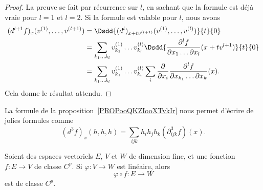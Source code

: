 \begin{proof}
    La preuve se fait par récurrence sur \( l\), en sachant que la formule est déjà vraie pour \( l=1\) et \( l=2\). Si la formule est valable pour \( l\), nous avons
    \begin{subequations}
        \begin{align}
            (d^{l+1}f)_x(v^{(1)},\ldots, v^{(l+1)})&=\Dsdd{ (d^l)_{x+tv^{(l+1)}}(v^{(1)},\ldots, v^{(l)}) }{t}{0}\\
            &=\sum_{k_1\ldots k_l}v_{k_1}^{(1)}\ldots v_{k_l}^{(l)}\Dsdd{   \frac{ \partial^lf }{ \partial x_1\ldots \partial x_l }(x+tv^{l+1})   }{t}{0}\\
            &=\sum_{k_1\ldots k_l}v_{k_1}^{(1)}\ldots v_{k_l}^{(l)}\sum_i\frac{ \partial  }{ \partial x_i }\frac{ \partial^lf }{ \partial x_{k_1}\ldots \partial x_k }(x).
        \end{align}
    \end{subequations}
    Cela donne le résultat attendu.
\end{proof}

\begin{normaltext}
    La formule de la proposition~\ref{PROPooQKZIooXTvkIr} nous permet d'écrire de jolies formules comme
    \begin{equation}        \label{EQooXRWWooMoKoOB}
        (d^3f)_x(h,h,h)=\sum_{ijk}h_ih_jh_k(\partial^3_{ijk}f)(x).
    \end{equation}
\end{normaltext}

\begin{proposition}
    Soient des espaces vectoriels \( E\),  \( V\) et \( W\) de dimension fine, et une fonction \( f\colon E\to V\) de classe \( C^p\). Si \( \varphi\colon V\to W\) est linéaire, alors
    \begin{equation}
        \varphi\circ f\colon E\to W
    \end{equation}
    est de classe \( C^p\).
\end{proposition}

